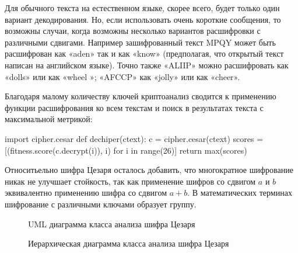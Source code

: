 Для обычного текста на естественном языке, скорее всего, будет 
только один вариант декодирования. Но, если использовать очень 
короткие сообщения, то возможны случаи, когда возможны несколько 
вариантов расшифровки с различными сдвигами. Например зашифрованный 
текст MPQY может быть расшифрован как «aden» так и как «know» 
(предполагая, что открытый текст написан на английском языке). 
Точно также «ALIIP» можно расшифровать как «dolls» или как «wheel
»; «AFCCP» как «jolly» или как «cheer».

Благодаря малому количеству ключей криптоанализ сводится
к применению функции расшифрования ко всем текстам и 
поиск в результатах текста с максимальной метрикой: 

\begin{listing}[1]{1}
import cipher.cesar
def dechiper(ctext):
    c = cipher.cesar(ctext)
    scores = [(fitness.score(c.decrypt(i)), i) for i in range(26)]
    return max(scores)
\end{listing}

Относитьельно шифра Цезаря осталось добавить, что
многократное шифрование никак не улучшает стойкость, так как 
применение шифров со сдвигом $a$ и $b$ эквивалентно применению шифра 
со сдвигом $a+b$. В математических терминах шифрование с различными 
ключами образует группу.

\begin{figure}[h]
\noindent{}
\caption{UML диаграмма класса анализа шифра Цезаря}
\label{figUCesar}
\end{figure}

\begin{figure}[h]
\noindent{}
\caption{Иерархическая диаграмма класса анализа шифра Цезаря}
\label{figICesar}
\end{figure}
